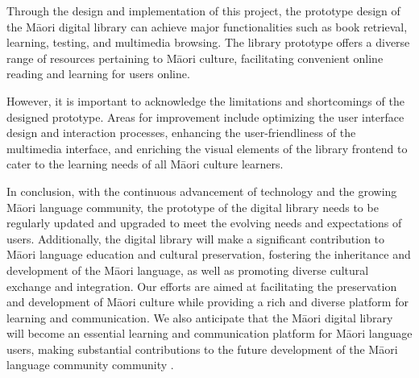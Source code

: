 Through the design and implementation of this project, the prototype design of the Māori digital library can achieve major functionalities such as book retrieval, learning, testing, and multimedia browsing. The library prototype offers a diverse range of resources pertaining to Māori culture, facilitating convenient online reading and learning for users online.

However, it is important to acknowledge the limitations and shortcomings of the designed prototype. Areas for improvement include optimizing the user interface design and interaction processes, enhancing the user-friendliness of the multimedia interface, and enriching the visual elements of the library frontend to cater to the learning needs of all Māori culture learners.

In conclusion, with the continuous advancement of technology and the growing Māori language community, the prototype of the digital library needs to be regularly updated and upgraded to meet the evolving needs and expectations of users. Additionally, the digital library will make a significant contribution to Māori language education and cultural preservation, fostering the inheritance and development of the Māori language, as well as promoting diverse cultural exchange and integration. Our efforts are aimed at facilitating the preservation and development of Māori culture while providing a rich and diverse platform for learning and communication. We also anticipate that the Māori digital library will become an essential learning and communication platform for Māori language users, making substantial contributions to the future development of the Māori language community community \autocite{MaoriCul16:online}.

